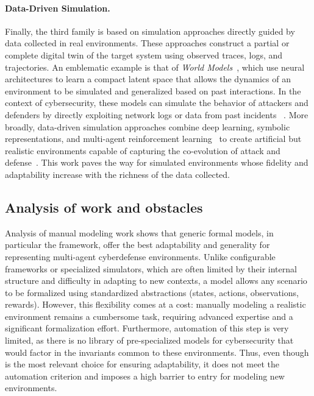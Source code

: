\paragraph{Data-Driven Simulation.}
Finally, the third family is based on simulation approaches directly guided by data collected in real environments. These approaches construct a partial or complete digital twin of the target system using observed traces, logs, and trajectories. An emblematic example is that of \textit{World Models}~\cite{Ha2018}, which use neural architectures to learn a compact latent space that allows the dynamics of an environment to be simulated and generalized based on past interactions. In the context of cybersecurity, these models can simulate the behavior of attackers and defenders by directly exploiting network logs or data from past incidents~\cite{D2mbiT0vgP4J} . More broadly, data-driven simulation approaches combine deep learning, symbolic representations, and multi-agent reinforcement learning~\cite{5oUSbVbTXX0J, RQyw5NYMj-wJ} to create artificial but realistic environments capable of capturing the co-evolution of attack and defense~\cite{oOfK6FXUSCAJ}. This work paves the way for simulated environments whose fidelity and adaptability increase with the richness of the data collected.

\subsection* {Analysis of work and obstacles}

Analysis of manual modeling work shows that generic formal models, in particular the  framework, offer the best adaptability and generality for representing multi-agent cyberdefense environments. Unlike configurable frameworks or specialized simulators, which are often limited by their internal structure and difficulty in adapting to new contexts, a  model allows any scenario to be formalized using standardized abstractions (states, actions, observations, rewards). However, this flexibility comes at a cost: manually modeling a realistic environment remains a cumbersome task, requiring advanced expertise and a significant formalization effort. Furthermore, automation of this step is very limited, as there is no library of pre-specialized  models for cybersecurity that would factor in the invariants common to these environments. Thus, even though  is the most relevant choice for ensuring adaptability, it does not meet the automation criterion and imposes a high barrier to entry for modeling new environments.

